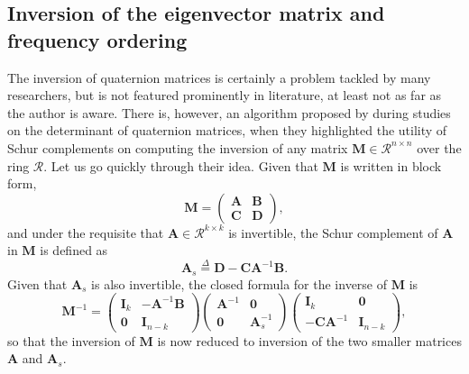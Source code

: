 \subsection{Inversion of the eigenvector matrix and frequency ordering}
\label{subsec:inversion}
The inversion of quaternion matrices is certainly a problem tackled by many researchers, but is not featured prominently in literature, at least not as far as the author is aware. There is, however, an algorithm proposed by \cite{cohen1999quaternionic} during studies on the determinant of quaternion matrices, when they highlighted the utility of Schur complements on computing the inversion of any matrix $\mathbf{M} \in \mathcal{R}^{n \times n}$ over the ring $\mathcal{R}$. Let us go quickly through their idea. Given that $\mathbf{M}$ is written in block form,
\begin{equation}
    \label{eq:block}
    \mathbf{M} = \begin{pmatrix}
        \mathbf{A} & \mathbf{B} \\
        \mathbf{C} & \mathbf{D}
    \end{pmatrix},
\end{equation}
and under the requisite that $\mathbf{A} \in \mathcal{R}^{k \times k}$ is invertible, the Schur complement of $\mathbf{A}$ in $\mathbf{M}$ is defined as
\begin{equation}
    \mathbf{A}_s \overset{\Delta}{=} \mathbf{D}
    - \mathbf{C}\mathbf{A}^{-1} \mathbf{B}.
\end{equation}
Given that $\mathbf{A}_s$ is also invertible, the closed formula for the inverse of $\mathbf{M}$ is
\begin{equation}
    \label{eq:schur}
    \mathbf{M}^{-1} =
    \begin{pmatrix}
        \mathbf{I}_k & - \mathbf{A}^{-1} \mathbf{B} \\
        \mathbf{0}   & \mathbf{I}_{n - k}
    \end{pmatrix}
    \begin{pmatrix}
        \mathbf{A}^{-1} & \mathbf{0}        \\
        \mathbf{0}      & \mathbf{A}_s^{-1}
    \end{pmatrix}
    \begin{pmatrix}
        \mathbf{I}_k                 & \mathbf{0}         \\
        - \mathbf{C} \mathbf{A}^{-1} & \mathbf{I}_{n - k}
    \end{pmatrix},
\end{equation}
so that the inversion of $\mathbf{M}$ is now reduced to inversion of the two smaller matrices $\mathbf{A}$ and $\mathbf{A}_s$.

